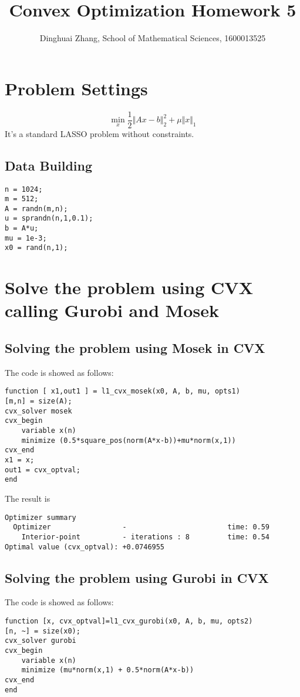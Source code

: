 \documentclass[11pt, oneside]{article}   	%
\title{Convex Optimization Homework 5}
\author{Dinghuai Zhang, School of Mathematical Sciences, 1600013525}
\date{}							%
\begin{document}
\maketitle
\section{Problem Settings}
\begin{equation}
\min_x \frac{1}{2}\Vert Ax-b\Vert^2_2+\mu\Vert x\Vert_1
\end{equation}
It's a standard LASSO problem without constraints.
\subsection{Data Building}
\lstset{
 frame=single, 
breaklines=true,
language=MATLAB,
 }
\begin{lstlisting}
n = 1024;
m = 512;
A = randn(m,n);
u = sprandn(n,1,0.1);
b = A*u;
mu = 1e-3;
x0 = rand(n,1);
\end{lstlisting}

\section{Solve the problem using CVX calling Gurobi and Mosek}

\subsection{Solving the problem using Mosek in CVX}
The code is showed as follows:
\lstset{
 frame=single, 
breaklines=true,
language=MATLAB,
 }
\begin{lstlisting}
function [ x1,out1 ] = l1_cvx_mosek(x0, A, b, mu, opts1)
[m,n] = size(A);
cvx_solver mosek
cvx_begin
    variable x(n)
    minimize (0.5*square_pos(norm(A*x-b))+mu*norm(x,1))
cvx_end
x1 = x;
out1 = cvx_optval;
end
\end{lstlisting}

The result is 
\lstset{
 frame=single, 
breaklines=true,
language=MATLAB,
 }
\begin{lstlisting}
Optimizer summary
  Optimizer                 -                        time: 0.59    
    Interior-point          - iterations : 8         time: 0.54   
Optimal value (cvx_optval): +0.0746955  
\end{lstlisting}

\subsection{Solving the problem using Gurobi in CVX}
The code is showed as follows:
\lstset{
 frame=single, 
breaklines=true,
language=MATLAB,
 }
\begin{lstlisting}
function [x, cvx_optval]=l1_cvx_gurobi(x0, A, b, mu, opts2)
[n, ~] = size(x0);
cvx_solver gurobi
cvx_begin 
    variable x(n)
    minimize (mu*norm(x,1) + 0.5*norm(A*x-b))    
cvx_end
end
\end{lstlisting}
\end{document}
